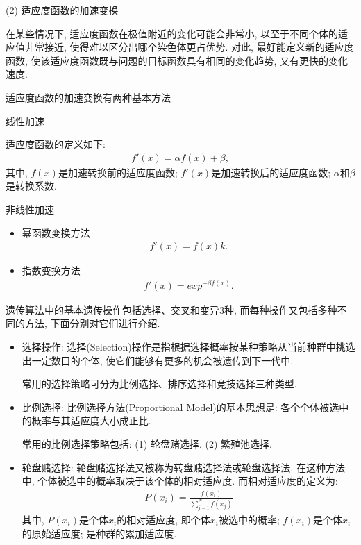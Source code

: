 (2) 适应度函数的加速变换

在某些情况下, 适应度函数在极值附近的变化可能会非常小, 以至于不同个体的适应值非常接近, 使得难以区分出哪个染色体更占优势. 对此, 最好能定义新的适应度函数, 使该适应度函数既与问题的目标函数具有相同的变化趋势, 又有更快的变化速度.

适应度函数的加速变换有两种基本方法

 线性加速

适应度函数的定义如下:
\begin{align}
  f'(x)=\alpha f(x)+\beta,
\end{align}
其中, $f(x)$是加速转换前的适应度函数; $f'(x)$是加速转换后的适应度函数;  $\alpha$和$\beta$是转换系数.

  非线性加速
\begin{itemize}
\item 幂函数变换方法
   \begin{align}
        f'(x)=f(x)k.
   \end{align}
\item 指数变换方法
         \begin{align}
            f'(x)=exp^{-\beta f(x)}.
         \end{align}
\end{itemize}

遗传算法中的基本遗传操作包括选择、交叉和变异3种, 而每种操作又包括多种不同的方法, 下面分别对它们进行介绍.

\begin{itemize}
\item 选择操作: 选择(Selection)操作是指根据选择概率按某种策略从当前种群中挑选出一定数目的个体, 使它们能够有更多的机会被遗传到下一代中.

    常用的选择策略可分为比例选择、排序选择和竞技选择三种类型.

\item 比例选择: 比例选择方法(Proportional Model)的基本思想是: 各个个体被选中的概率与其适应度大小成正比.

    常用的比例选择策略包括: (1) 轮盘赌选择. (2) 繁殖池选择.

\item 轮盘赌选择: 轮盘赌选择法又被称为转盘赌选择法或轮盘选择法. 在这种方法中, 个体被选中的概率取决于该个体的相对适应度. 而相对适应度的定义为:
\begin{align}
  P\left(x_{i}\right)=\frac{f\left(x_{i}\right)}{\sum_{j=1}^{N} f\left(x_{j}\right)}
\end{align}
其中, $P(x_i)$是个体$x_i$的相对适应度, 即个体$x_i$被选中的概率; $f(x_i)$是个体$x_i$的原始适应度; 是种群的累加适应度.
\end{itemize}

